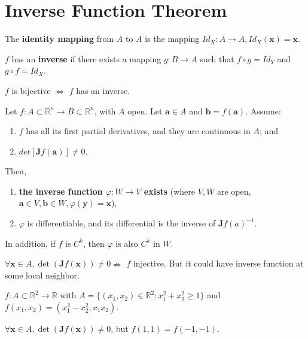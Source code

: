 \section{Inverse Function Theorem}

\begin{definition}
    The \textbf{identity mapping} from $A$ to $A$ is the mapping $Id_X: A \to A, Id_X(\mathbf{x}) = \mathbf{x}$.
\end{definition}

\begin{definition}
    $f$ has an \textbf{inverse} if there exists a mapping $g: B \to A$ such that $f \circ g = Id_Y$ and $g \circ f = Id_X$.
\end{definition}

\begin{proposition}
    $f$ is bijective $\iff$ $f$ has an inverse.
\end{proposition}

\begin{theorem}
    Let $f: A \subset \mathbb{R}^{n} \to B \subset \mathbb{R}^{n}$, with $A$ open. Let $\mathbf{a} \in A$ and $\mathbf{b} = f(\mathbf{a})$. Assume:
    \begin{enumerate}
        \item $f$ has all its first partial derivatives, and they are continuous in $A$; and
        \item $det[\mathbf{J}f(\mathbf{a})] \neq 0$.
    \end{enumerate}
    Then, \begin{enumerate}
        \item \textbf{the inverse function $\varphi: W \to V$ exists} (where $V, W$ are open, $\mathbf{a} \in V, \mathbf{b} \in W, \varphi (\mathbf{y}) = \mathbf{x}$),
        \item $\varphi$ is differentiable, and its differential is the inverse of $\mathbf{J}f(a)^{-1}$.
    \end{enumerate}
    In addition, if $f$ is $C ^{k}$, then $\varphi$ is also $C ^{k}$ in $W$.
\end{theorem}

\begin{remark*}
    $\forall \mathbf{x} \in A, \det (\mathbf{J}f(\mathbf{x})) \neq 0 \nRightarrow$ $f$ injective. But it could have inverse function at some local neighbor.

    \begin{example*}
        $f: A \subset \mathbb{R}^{2} \to \mathbb{R}$ with $A = \{(x_1,x_2)\in \mathbb{R}^{2}: x_1 ^{2} + x_2 ^{2} \geq 1\}$ and $f(x_1,x_2) = (x_1 ^{2} - x_2 ^{2}, x_1x_2)$.

        $\forall \mathbf{x} \in A, \det (\mathbf{J}f(\mathbf{x})) \neq 0$, but $f(1,1) = f(-1,-1)$.
    \end{example*}
\end{remark*}



